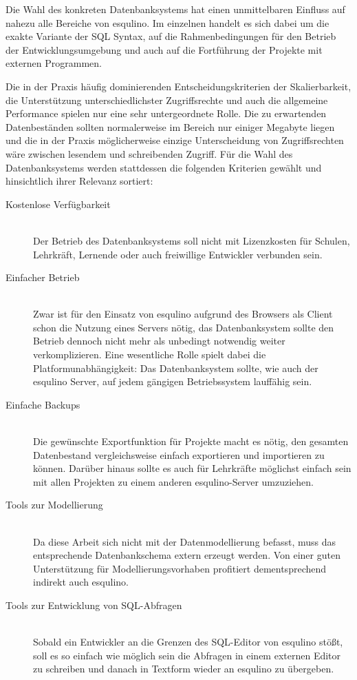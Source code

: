 Die Wahl des konkreten Datenbanksystems hat einen unmittelbaren Einfluss auf nahezu alle Bereiche von esqulino. Im einzelnen handelt es sich dabei um die exakte Variante der SQL Syntax, auf die Rahmenbedingungen für den Betrieb der Entwicklungsumgebung und auch auf die Fortführung der Projekte mit externen Programmen.

Die in der Praxis häufig dominierenden Entscheidungskriterien der Skalierbarkeit, die Unterstützung unterschiedlichster Zugriffsrechte und auch die allgemeine Performance spielen nur eine sehr untergeordnete Rolle. Die zu erwartenden Datenbeständen sollten normalerweise im Bereich nur einiger Megabyte liegen und die in der Praxis möglicherweise einzige Unterscheidung von Zugriffsrechten wäre zwischen lesendem und schreibenden Zugriff. Für die Wahl des Datenbanksystems werden stattdessen die folgenden Kriterien gewählt und hinsichtlich ihrer Relevanz sortiert:

\begin{description}  
\item[Kostenlose Verfügbarkeit] \hfill \\
  Der Betrieb des Datenbanksystems soll nicht mit Lizenzkosten für Schulen, Lehrkräft, Lernende oder auch freiwillige Entwickler verbunden sein.
\item[Einfacher Betrieb] \hfill \\
  Zwar ist für den Einsatz von esqulino aufgrund des Browsers als Client schon die Nutzung eines Servers nötig, das Datenbanksystem sollte den Betrieb dennoch nicht mehr als unbedingt notwendig weiter verkomplizieren. Eine wesentliche Rolle spielt dabei die Platformunabhängigkeit: Das Datenbanksystem sollte, wie auch der esqulino Server, auf jedem gängigen Betriebssystem lauffähig sein.
\item[Einfache Backups] \hfill \\
  Die gewünschte Exportfunktion für Projekte macht es nötig, den gesamten Datenbestand vergleichsweise einfach exportieren und importieren zu können. Darüber hinaus sollte es auch für Lehrkräfte möglichst einfach sein mit allen Projekten zu einem anderen esqulino-Server umzuziehen.
\item[Tools zur Modellierung] \hfill \\
  Da diese Arbeit sich nicht mit der Datenmodellierung befasst, muss das entsprechende Datenbankschema extern erzeugt werden. Von einer guten Unterstützung für Modellierungsvorhaben profitiert dementsprechend indirekt auch esqulino.
\item[Tools zur Entwicklung von SQL-Abfragen] \hfill \\
  Sobald ein Entwickler an die Grenzen des SQL-Editor von esqulino stößt, soll es so einfach wie möglich sein die Abfragen in einem externen Editor zu schreiben und danach in Textform wieder an esqulino zu übergeben.
\end{description}


